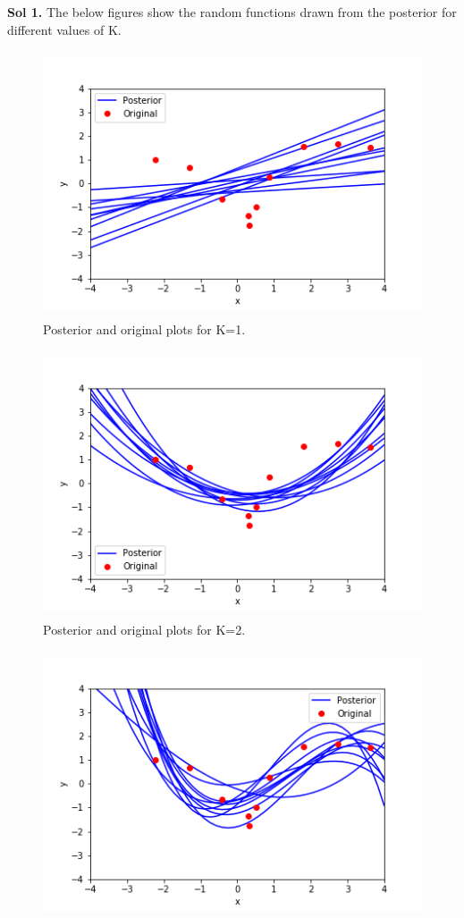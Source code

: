 \documentclass[a4paper,11pt]{article}
\begin{document}
\begin{pmisolution}
\textbf{Sol 1.} The below figures show the random functions drawn from the posterior for different values of K.  
\begin{figure}[h]
\centering
\includegraphics[height = 3.1in]{question_6a_1.png}
\caption{Posterior and original plots for K=1.} 
\end{figure}\begin{figure}[h]
\centering
\includegraphics[height=3.1in]{question_6a_2.png}
\caption{Posterior and original plots for K=2.}
\end{figure}
\begin{figure}[h]
\centering
\includegraphics[height=3.1in]{question_6a_3.png}

\end{figure}
\end{pmisolution}
\end{document}
